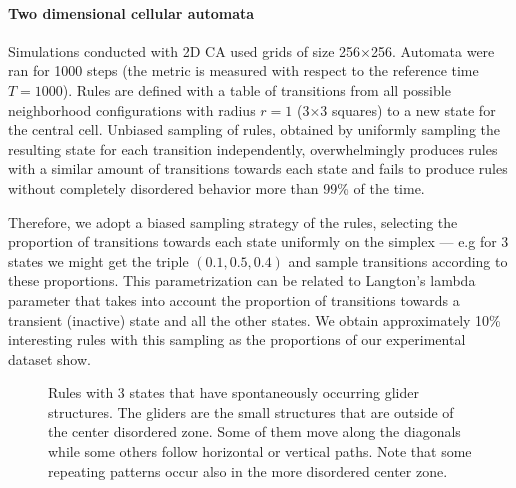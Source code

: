 \paragraph{Two dimensional cellular automata}

Simulations conducted with 2D CA used grids of size 256$\times$256. Automata
were ran for 1000 steps (the metric is measured with respect to the reference
time $T = 1000$). Rules are defined with a table of transitions from all
possible neighborhood configurations with radius $r=1$ (3$\times$3 squares) to a
new state for the central cell. Unbiased sampling of rules, obtained by
uniformly sampling the resulting state for each transition independently,
overwhelmingly produces rules with a similar amount of transitions towards each
state and fails to produce rules without completely disordered behavior more
than 99\% of the time.

Therefore, we adopt a biased sampling strategy of the rules, selecting the
proportion of transitions towards each state uniformly on the simplex --- e.g
for 3 states we might get the triple $(0.1, 0.5, 0.4)$ and sample transitions
according to these proportions. This parametrization can be related to Langton's
lambda parameter \parencite{langtonComputationEdgeChaos1990} that takes into account the
proportion of transitions towards a transient (inactive) state and all the other
states. We obtain approximately 10\% interesting rules with this sampling as the
proportions of our experimental dataset show.

\begin{figure}[t]
  \centering
  \hfil
  \caption{Rules with 3 states that have spontaneously occurring glider
    structures. The gliders are the small structures that are outside of the
    center disordered zone. Some of them move along the diagonals while some
    others follow horizontal or vertical paths. Note that some repeating
    patterns occur also in the more disordered center zone.}
  \label{fig:gliders}
\end{figure}

